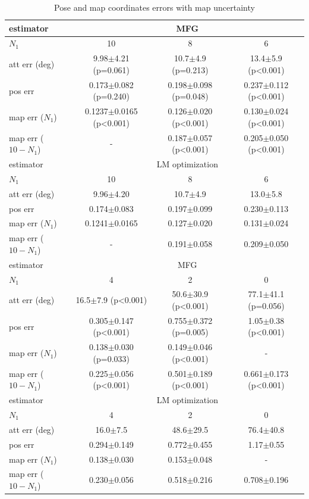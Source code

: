 \begin{table}
	\centering
	\caption{Pose and map coordinates errors with map uncertainty}
	\label{tab:VIO-error-pose-map}
	\footnotesize
	\begin{tabular}{l|ccc}
		\hline\hline
		estimator & \multicolumn{3}{c}{MFG} \\ \hline
		$N_1$ & 10 & 8 & 6 \\ \hline
		att err (deg) & 9.98$\pm$4.21 (p=0.061) & 10.7$\pm$4.9 (p=0.213) & 13.4$\pm$5.9 (p<0.001) \\
		pos err & 0.173$\pm$0.082 (p=0.240) & 0.198$\pm$0.098 (p=0.048) & 0.237$\pm$0.112 (p<0.001) \\
		map err ($N_1$) & 0.1237$\pm$0.0165 (p<0.001) & 0.126$\pm$0.020 (p<0.001) & 0.130$\pm$0.024 (p<0.001) \\
		map err ($10-N_1$) & - & 0.187$\pm$0.057 (p<0.001) & 0.205$\pm$0.050 (p<0.001) \\
		\midrule[1.2pt]
		estimator & \multicolumn{3}{c}{LM optimization} \\ \hline
		$N_1$ & 10 & 8 & 6 \\ \hline
		att err (deg) & 9.96$\pm$4.20 & 10.7$\pm$4.9 & 13.0$\pm$5.8 \\
		pos err & 0.174$\pm$0.083 & 0.197$\pm$0.099 & 0.230$\pm$0.113 \\
		map err ($N_1$) & 0.1241$\pm$0.0165 & 0.127$\pm$0.020 & 0.131$\pm$0.024 \\
		map err ($10-N_1$) & - & 0.191$\pm$0.058 & 0.209$\pm$0.050 \\
		\hline\hline
		estimator & \multicolumn{3}{c}{MFG} \\ \hline
		$N_1$ & 4 & 2 & 0 \\ \hline
		att err (deg) & 16.5$\pm$7.9 (p<0.001) & 50.6$\pm$30.9 (p<0.001) & 77.1$\pm$41.1 (p=0.056) \\
		pos err & 0.305$\pm$0.147 (p<0.001) & 0.755$\pm$0.372 (p=0.005) & 1.05$\pm$0.38 (p<0.001) \\
		map err ($N_1$) & 0.138$\pm$0.030 (p=0.033) & 0.149$\pm$0.046 (p<0.001) & - \\
		map err ($10-N_1$) & 0.225$\pm$0.056 (p<0.001) & 0.501$\pm$0.189 (p<0.001) & 0.661$\pm$0.173 (p<0.001) \\
		\midrule[1.2pt]
		estimator & \multicolumn{3}{c}{LM optimization} \\ \hline
		$N_1$ & 4 & 2 & 0 \\ \hline
		att err (deg) & 16.0$\pm$7.5 & 48.6$\pm$29.5 & 76.4$\pm$40.8 \\
		pos err & 0.294$\pm$0.149 & 0.772$\pm$0.455 & 1.17$\pm$0.55 \\
		map err ($N_1$) & 0.138$\pm$0.030 & 0.153$\pm$0.048 & - \\
		map err ($10-N_1$) & 0.230$\pm$0.056 & 0.518$\pm$0.216 & 0.708$\pm$0.196 \\
		\hline\hline
	\end{tabular}
\end{table}

